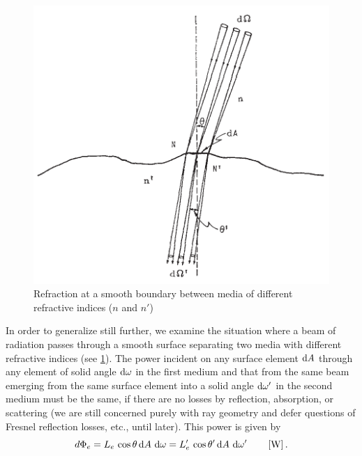 \begin{refsection}
\begin{figure}
\begin{center}
\includegraphics{figures/nicodemus1963-fig3.pdf}	
\end{center}
\caption{Refraction at a smooth boundary between media of
different refractive indices ($n$ and $n'$)}
\label{fig:nicodemus3}
\end{figure}

In order to generalize still further, we examine the situation where a beam of
radiation passes through a smooth surface separating two media with different
refractive indices (see \cref{fig:nicodemus3}). The power incident on any
surface element $\mathop{}\!\mathrm{d} A$ through any element of solid angle $\mathop{}\!\mathrm{d} \omega$ in the first
medium and that from the same beam emerging from the same surface element into
a solid angle $\mathop{}\!\mathrm{d} \omega'$ in the second medium must be the same, if there are no
losses by reflection, absorption, or scattering (we are still concerned purely
with ray geometry and defer questions of Fresnel reflection losses, etc., until
later). This power is given by
\begin{equation}\label{eqn:nicodemus13}
d\Phi_e = L_e\,\cos\theta \d A\, \d \omega = L_e'\,\cos\theta' \d A\, \d \omega'
\qquad \left[\unit{\watt}\right].
\end{equation}


\end{refsection}

